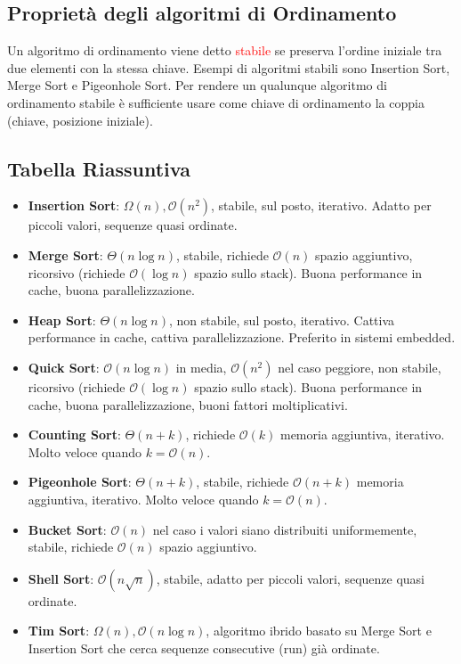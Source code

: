 \documentclass[../cheatSheetAlgoritmi.tex]{subfiles}
\begin{document}
\subsection{Proprietà degli algoritmi di Ordinamento}
Un algoritmo di ordinamento viene detto \textcolor{red}{stabile} se preserva l'ordine iniziale tra due elementi con la stessa chiave. Esempi di algoritmi stabili sono Insertion Sort, Merge Sort e Pigeonhole Sort. Per rendere un qualunque algoritmo di ordinamento stabile è sufficiente usare come chiave di ordinamento la coppia (chiave, posizione iniziale).
\subsection{Tabella Riassuntiva}
\begin{itemize}
	\item \textbf{Insertion Sort}: $\Omega(n), \mathcal{O}(n^{2})$, stabile, sul posto, iterativo. Adatto per piccoli valori, sequenze quasi ordinate.
	\item \textbf{Merge Sort}: $\Theta(n \log n)$, stabile, richiede $\mathcal{O}(n)$ spazio aggiuntivo, ricorsivo (richiede $\mathcal{O}(\log n)$ spazio sullo stack). Buona performance in cache, buona parallelizzazione.
	\item \textbf{Heap Sort}: $\Theta(n \log n)$, non stabile, sul posto, iterativo. Cattiva performance in cache, cattiva parallelizzazione. Preferito in sistemi embedded.
	\item \textbf{Quick Sort}: $\mathcal{O}(n \log n)$ in media, $\mathcal{O}(n^{2})$ nel caso peggiore, non stabile, ricorsivo (richiede $\mathcal{O}(\log n)$ spazio sullo stack). Buona performance in cache, buona parallelizzazione, buoni fattori moltiplicativi.
	\item \textbf{Counting Sort}: $\Theta(n + k)$, richiede $\mathcal{O}(k)$ memoria aggiuntiva, iterativo. Molto veloce quando $k = \mathcal{O}(n)$.
	\item \textbf{Pigeonhole Sort}: $\Theta(n + k)$, stabile, richiede $\mathcal{O}(n + k)$ memoria aggiuntiva, iterativo. Molto veloce quando $k = \mathcal{O}(n)$.
	\item \textbf{Bucket Sort}: $\mathcal{O}(n)$ nel caso i valori siano distribuiti uniformemente, stabile, richiede $\mathcal{O}(n)$ spazio aggiuntivo.
	\item \textbf{Shell Sort}: $\mathcal{O}(n \sqrt{n})$, stabile, adatto per piccoli valori, sequenze quasi ordinate.
	\item \textbf{Tim Sort}:  $\Omega(n), \mathcal{O}(n \log n)$, algoritmo ibrido basato su Merge Sort e Insertion Sort che cerca sequenze consecutive (run) già ordinate.
\end{itemize}
\newpage
\end{document}
